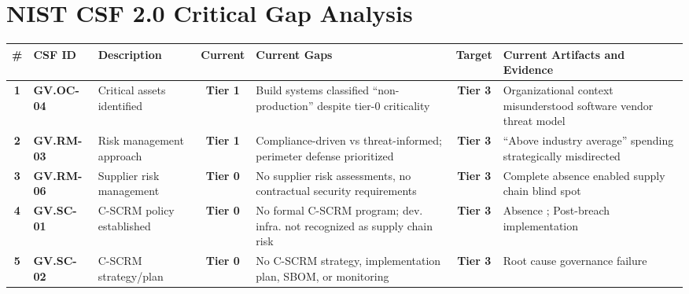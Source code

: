 \clearpage
\section{NIST CSF 2.0 Critical Gap Analysis}
\label{app:csf}

\newcommand{\tierzero}{\cellcolor{red!20}\textbf{Tier 0}}
\newcommand{\tierone}{\cellcolor{orange!20}\textbf{Tier 1}}
\newcommand{\tierthree}{\cellcolor{green!20}\textbf{Tier 3}}

\begin{table}[h]
    \centering
    \small
    \renewcommand{\arraystretch}{1.4}
    \begin{tabularx}{\linewidth}{>{\bfseries}c >{\bfseries}l >{\raggedright\arraybackslash}X c >{\raggedright\arraybackslash}X c >{\raggedright\arraybackslash}X}
        \toprule
        \# & CSF ID & Description & Current & Current Gaps & Target & Current Artifacts and Evidence \\
        \midrule
        1 & GV.OC-04 & Critical assets identified & \tierone & Build systems classified ``non-production'' despite tier-0 criticality & \tierthree & Organizational context misunderstood software vendor threat model \cite{boyens_cybersecurity_2024} \\
        
        2 & GV.RM-03 & Risk management approach & \tierone & Compliance-driven vs threat-informed; perimeter defense prioritized & \tierthree & ``Above industry average'' spending strategically misdirected \cite{nagle_solarwinds_2023} \\
        
        3 & GV.RM-06 & Supplier risk management & \tierzero & No supplier risk assessments, no contractual security requirements & \tierthree & Complete absence enabled supply chain blind spot \cite{boyens_cybersecurity_2024} \\
        
        4 & GV.SC-01 & C-SCRM policy established & \tierzero & No formal C-SCRM program; dev. infra. not recognized as supply chain risk & \tierthree & Absence \cite{us_open_2021}; Post-breach implementation \cite{nagle_solarwinds_2023} \\
        
        5 & GV.SC-02 & C-SCRM strategy/plan & \tierzero & No C-SCRM strategy, implementation plan, SBOM, or monitoring & \tierthree & Root cause governance failure \cite{boyens_cybersecurity_2024} \\
        

\end{tabularx}
\end{table}

